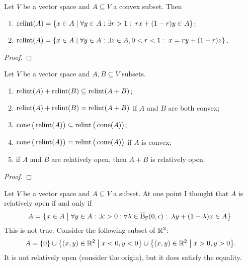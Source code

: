\begin{lemma}
Let $V$ be a vector space and $A\subseteq V$ a convex subset. Then
\begin{enumerate}
\item $\relint(A) = \setbuilder{x\in A}{\forall y\in A: \exists r > 1: \; rx + (1-r)y \in A}$;
\item $\relint(A) = \setbuilder{x\in A}{\forall y\in A: \exists z\in A, 0 < r < 1:\; x = ry + (1-r)z}$.
\end{enumerate}
\end{lemma}
\begin{proof}

\end{proof}

\begin{lemma}
Let $V$ be a vector space and $A, B\subseteq V$ subsets.
\begin{enumerate}
\item $\operatorname{relint}(A)+\operatorname{relint}(B) \subseteq \operatorname{relint}(A+B)$;
\item $\operatorname{relint}(A)+\operatorname{relint}(B) = \operatorname{relint}(A+B)$ if $A$ and $B$ are both convex;
\item $\operatorname{cone}\big(\operatorname{relint}(A)\big) \subseteq \operatorname{relint}\big(\operatorname{cone}(A)\big)$;
\item $\operatorname{cone}\big(\operatorname{relint}(A)\big) = \operatorname{relint}\big(\operatorname{cone}(A)\big)$ if $A$ is convex;
\item if $A$ and $B$ are relatively open, then $A+B$ is relatively open.
\end{enumerate}
\end{lemma}
\begin{proof}

\end{proof}

\begin{example}
Let $V$ be a vector space and $A\subseteq V$ a subset. At one point I thought that $A$ is relatively open \textup{if and only if}
\[ A = \setbuilder{x\in A}{\forall y\in A: \exists \epsilon >0: \forall \lambda \in \cball_\F(0,\epsilon):\; \lambda y + (1-\lambda)x \in A}. \]
This is not true. Consider the following subset of $\mathbb{R}^2$:
\[ A = \{0\} \cup \setbuilder{(x,y)\in \R^2}{x<0, y<0} \cup \setbuilder{(x,y)\in \R^2}{x>0, y>0}. \]
It is not relatively open (consider the origin), but it does satisfy the equality.
\end{example}


